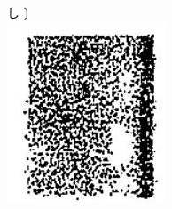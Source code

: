 \documentclass[10pt]{article}
\begin{document}
し 〕\\
\includegraphics[max width=\textwidth, center]{2025_02_27_dd68c3d38de88f0516d9g-159(2)}\\
\end{document}
